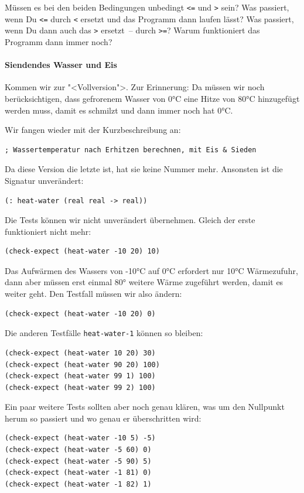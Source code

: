 %
\begin{aufgabe}
  Müssen es bei den beiden Bedingungen unbedingt \verb|<=| und
  \verb|>| sein?  Was passiert, wenn Du \verb|<=| durch \verb|<|
  ersetzt und das Programm dann laufen lässt?  Was passiert, wenn Du
  dann auch das \verb|>| ersetzt~-- durch \verb|>=|?  Warum
  funktioniert das Programm dann immer noch?
\end{aufgabe}
%
\paragraph{Siendendes Wasser und Eis} Kommen wir zur "<Vollversion">.
Zur Erinnerung: Da müssen wir noch berücksichtigen, dass gefrorenem
Wasser von 0°C eine Hitze von 80°C hinzugefügt werden muss, damit es
schmilzt und dann immer noch hat 0°C.  

Wir fangen wieder mit der Kurzbeschreibung an:
%
\begin{verbatim}
; Wassertemperatur nach Erhitzen berechnen, mit Eis & Sieden
\end{verbatim}
%
Da diese Version die letzte ist, hat sie keine Nummer mehr.  Ansonsten
ist die Signatur unverändert:
%
\begin{verbatim}
(: heat-water (real real -> real))
\end{verbatim}
%
Die Tests können wir nicht unverändert übernehmen.  Gleich der erste
funktioniert nicht mehr:
%
\begin{verbatim}
(check-expect (heat-water -10 20) 10)
\end{verbatim}
%
Das Aufwärmen des Wassers von -10°C auf 0°C erfordert nur 10°C
Wärmezufuhr, dann aber müssen erst einmal 80° weitere Wärme zugeführt
werden, damit es weiter geht.  Den Testfall müssen wir also ändern:
%
\begin{verbatim}
(check-expect (heat-water -10 20) 0)
\end{verbatim}
%
Die anderen Testfälle \texttt{heat-water-1} können so bleiben:
%
\begin{verbatim}
(check-expect (heat-water 10 20) 30)
(check-expect (heat-water 90 20) 100)
(check-expect (heat-water 99 1) 100)
(check-expect (heat-water 99 2) 100)
\end{verbatim}
%
Ein paar weitere Tests sollten aber noch genau klären, was um den
Nullpunkt herum so passiert und wo genau er überschritten wird:
%
\begin{verbatim}
(check-expect (heat-water -10 5) -5)
(check-expect (heat-water -5 60) 0)
(check-expect (heat-water -5 90) 5)
(check-expect (heat-water -1 81) 0)
(check-expect (heat-water -1 82) 1)
\end{verbatim}
